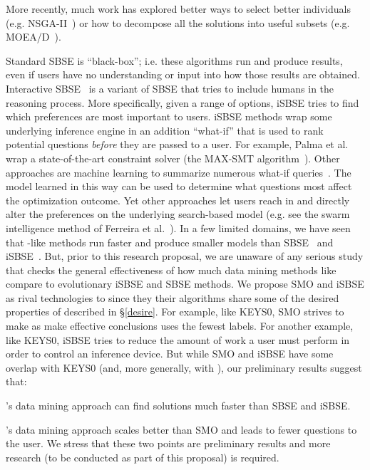 More recently, much work has explored better ways to select better individuals (e.g. NSGA-II~\cite{deb2002fast}) or how to decompose all the solutions into useful subsets (e.g. MOEA/D~\cite{Zhang07}).  \item
Standard SBSE is ``black-box''; i.e. these algorithms run and produce results,
even if users have no understanding or input into how those results are obtained.
Interactive SBSE~\cite{amal2014use,araujo2017architecture,mkaouer2016interactive,lin2016interactive,marculescu2013objective,simons2014interactive,palma2011using,tonella2013interactive,ramirez2018systematic,goyal2018identifying,do2016incorporating} is a variant of SBSE that tries to include humans     in the reasoning process. More specifically, given a range of options,
iSBSE tries to find which preferences are most important to users. iSBSE methods wrap some underlying inference engine
in an addition ``what-if'' that is  used to rank potential questions {\em before} they are
passed to a user.  
For example, 
Palma et al.~\cite{palma2011using} wrap a  state-of-the-art constraint solver
(the MAX-SMT algorithm~\cite{kautz96}). 
Other approaches are machine learning to summarize numerous
what-if queries~\cite{araujo2017architecture}. The model learned in this way can be used to
determine what questions most affect the optimization
outcome. Yet other approaches let users reach in
and directly alter the preferences on the underlying
search-based model (e.g. see the swarm intelligence method of Ferreira et al.~\cite{do2016incorporating}).
In a few limited domains, we have seen that {\IT}-like methods
run faster and produce smaller models than SBSE~\cite{DBLP:conf/re/FeatherM02} and iSBSE~\cite{lustosa21}. But, prior to this research proposal,
we are unaware of any  serious study that checks
the general effectiveness of
how much data mining
methods like {\IT} compare to evolutionary iSBSE and SBSE methods.
\ei
We propose SMO and iSBSE as rival technologies to {\IT} since they
their algorithms share some of the desired properties of {\IT}
described in \S\ref{desire}.
For example,  like KEYS0, SMO strives to make as make effective conclusions uses the fewest labels. For another example, like KEYS0, iSBSE tries
to reduce the amount of work a user must perform in order to control an inference device.
 But while SMO and iSBSE have some overlap with KEYS0 (and, more generally, with {\IT}),
 our preliminary results suggest that:
 \be
 \item
 {\IT}'s data mining approach can find solutions
 much faster than SBSE and iSBSE.
 \item 
 {\IT}'s data mining approach scales better than SMO and leads to fewer questions
 to the user.
 \ee
 We stress that these two points are preliminary results and more research (to be conducted as part of
 this proposal) is required.
 

